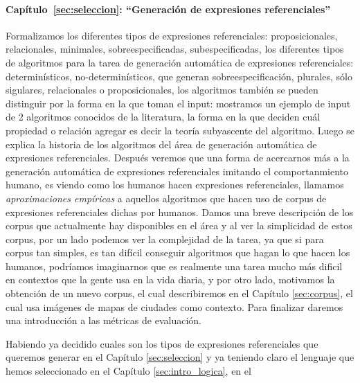 \paragraph{Cap\'itulo~\ref{sec:seleccion}: ``Generaci\'on de expresiones referenciales''} Formalizamos los diferentes tipos de expresiones referenciales: 
proposicionales, relacionales, minimales, sobreespecificadas, subespecificadas, los diferentes tipos de algoritmos para la tarea de 
generaci\'on autom\'atica de expresiones referenciales: determin\'isticos, no-determin\'isticos, que generan sobreespecificaci\'on, 
plurales, s\'olo sigulares, relacionales o proposicionales, los algoritmos tambi\'en se pueden distinguir por la forma en la que toman el 
input: mostramos un ejemplo de input de 2 algoritmos conocidos de la literatura, la forma en la que deciden cu\'al propiedad o relaci\'on 
agregar es decir la teor\'ia subyascente del algoritmo. Luego se explica la historia de los algoritmos del \'area de generaci\'on autom\'atica
 de expresiones referenciales. Despu\'es veremos que una forma de acercarnos m\'as a la generaci\'on autom\'atica de expresiones referenciales
 imitando el comportanmiento humano, es viendo como los humanos hacen expresiones referenciales, llamamos {\it aproximaciones emp\'iricas} 
a aquellos algoritmos que hacen uso de corpus de expresiones referenciales dichas por humanos. Damos una breve descripci\'on de los corpus 
que actualmente hay disponibles en el \'area y al ver la simplicidad de estos corpus, por un lado podemos ver la complejidad de la tarea, 
ya que si para corpus tan simples, es tan dif\'icil conseguir algoritmos que hagan lo que hacen los humanos, podr\'iamos imaginarnos que es 
realmente una tarea mucho m\'as dificil en contextos que la gente usa en la vida diaria, y por otro lado, motivamos la obtenci\'on de un nuevo
 corpus, el cual describiremos en el Cap\'itulo \ref{sec:corpus}, el cual usa im\'agenes de mapas de ciudades como contexto. Para finalizar 
daremos una introducci\'on a las m\'etricas de evaluaci\'on. 

Habiendo ya decidido cuales son los tipos de expresiones referenciales que queremos generar en el Cap\'itulo \ref{sec:seleccion} y ya teniendo 
claro el lenguaje \EL que hemos seleccionado en el Cap\'itulo \ref{sec:intro_logica}, en el 

